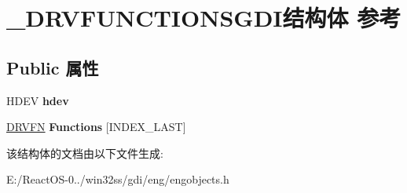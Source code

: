 \hypertarget{struct___d_r_v_f_u_n_c_t_i_o_n_s_g_d_i}{}\section{\+\_\+\+D\+R\+V\+F\+U\+N\+C\+T\+I\+O\+N\+S\+G\+D\+I结构体 参考}
\label{struct___d_r_v_f_u_n_c_t_i_o_n_s_g_d_i}
\subsection*{Public 属性}
\begin{DoxyCompactItemize}
\item 
\mbox{\label{struct___d_r_v_f_u_n_c_t_i_o_n_s_g_d_i_af47d235378471675f8f337ebfcf05bfd}} 
H\+D\+EV {\bfseries hdev}
\item 
\mbox{\label{struct___d_r_v_f_u_n_c_t_i_o_n_s_g_d_i_a6426369af85652ead9461fb5d6d3be78}} 
\hyperlink{struct___d_r_v_f_n}{D\+R\+V\+FN} {\bfseries Functions} \mbox{[}I\+N\+D\+E\+X\+\_\+\+L\+A\+ST\mbox{]}
\end{DoxyCompactItemize}


该结构体的文档由以下文件生成\+:\begin{DoxyCompactItemize}
\item 
E\+:/\+React\+O\+S-\/0../win32ss/gdi/eng/engobjects.\+h\end{DoxyCompactItemize}

